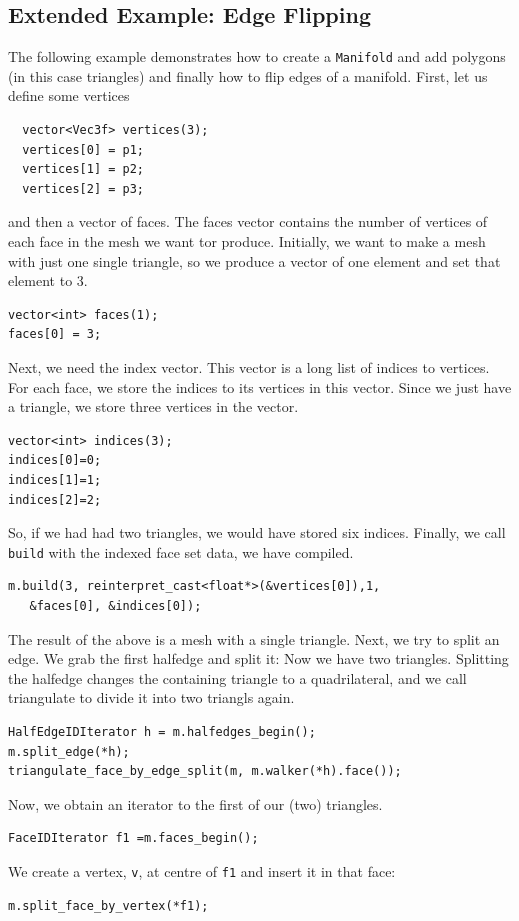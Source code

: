 \documentclass[a4paper]{article}
\begin{document}
\subsection{Extended Example: Edge Flipping}
The following example demonstrates how to create a \texttt{Manifold} and add polygons (in this case triangles) and finally how to flip edges of a manifold. First, let us define some vertices
\begin{verbatim}
  vector<Vec3f> vertices(3);
  vertices[0] = p1;
  vertices[1] = p2;
  vertices[2] = p3;
\end{verbatim}
and then a vector of faces. The faces vector contains the number of vertices of each face in the mesh we want tor produce. Initially, we want to make a mesh with just one single triangle, so we produce a vector of one element and set that element to 3.
\begin{verbatim}
vector<int> faces(1);
faces[0] = 3;
\end{verbatim}
Next, we need the index vector. This vector is a long list of indices to vertices. For each face, we store the indices to its vertices in this vector. Since we just have a triangle, we store three vertices in the vector.
\begin{verbatim}
vector<int> indices(3);
indices[0]=0;
indices[1]=1;
indices[2]=2;
\end{verbatim}
So, if we had had two triangles, we would have stored six indices. Finally, we call \texttt{build} with the indexed face set data, we have compiled. 
\begin{verbatim}
m.build(3, reinterpret_cast<float*>(&vertices[0]),1,
   &faces[0], &indices[0]);
\end{verbatim}
The result of the above is a mesh with a single triangle.
Next, we try to split an edge. We grab the first halfedge and split it: Now we have two triangles. Splitting the halfedge changes the containing triangle to a quadrilateral, and we call triangulate to divide it into two triangls again.
\begin{verbatim}
HalfEdgeIDIterator h = m.halfedges_begin();
m.split_edge(*h); 
triangulate_face_by_edge_split(m, m.walker(*h).face());
\end{verbatim}
Now, we obtain an iterator to the first of our (two) triangles.
\begin{verbatim}
FaceIDIterator f1 =m.faces_begin();
\end{verbatim}
We create a vertex, \texttt{v}, at centre of \texttt{f1} and insert it in that face:
\begin{verbatim}
m.split_face_by_vertex(*f1);
\end{verbatim}
\end{document}
